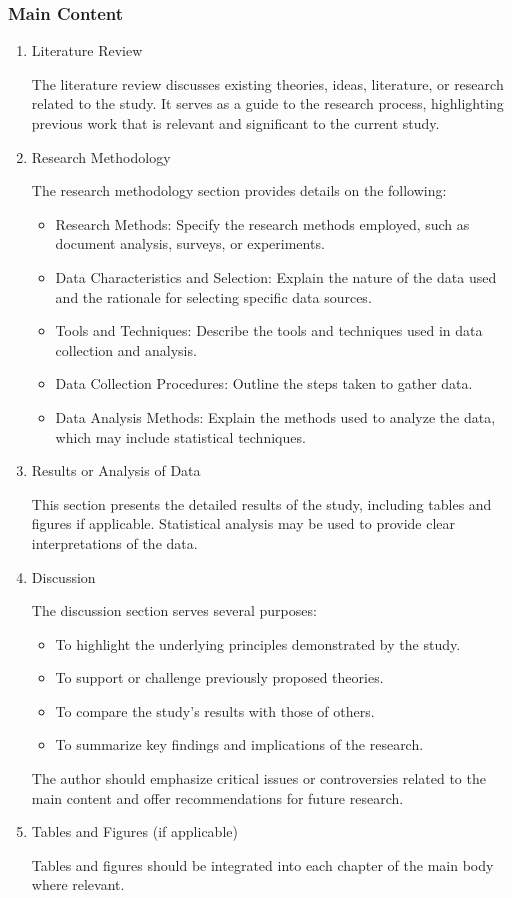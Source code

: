 \subsubsection{Main Content}
\begin{enumerate}[label=\arabic*)]
    \item Literature Review

    The literature review discusses existing theories, ideas, literature, or research related to the study. It serves as a guide to the research process, highlighting previous work that is relevant and significant to the current study.

    \item Research Methodology

    The research methodology section provides details on the following:
    \begin{itemize}
        \item Research Methods: Specify the research methods employed, such as document analysis, surveys, or experiments.
        \item Data Characteristics and Selection: Explain the nature of the data used and the rationale for selecting specific data sources.
        \item Tools and Techniques: Describe the tools and techniques used in data collection and analysis.
        \item Data Collection Procedures: Outline the steps taken to gather data.
        \item Data Analysis Methods: Explain the methods used to analyze the data, which may include statistical techniques.
    \end{itemize}

    \item Results or Analysis of Data

    This section presents the detailed results of the study, including tables and figures if applicable. Statistical analysis may be used to provide clear interpretations of the data.

    \item Discussion

    The discussion section serves several purposes:
    \begin{itemize}
        \item To highlight the underlying principles demonstrated by the study.
        \item To support or challenge previously proposed theories.
        \item To compare the study's results with those of others.
        \item To summarize key findings and implications of the research.
    \end{itemize}

    The author should emphasize critical issues or controversies related to the main content and offer recommendations for future research.

    \item Tables and Figures (if applicable)

    Tables and figures should be integrated into each chapter of the main body where relevant.
\end{enumerate}

